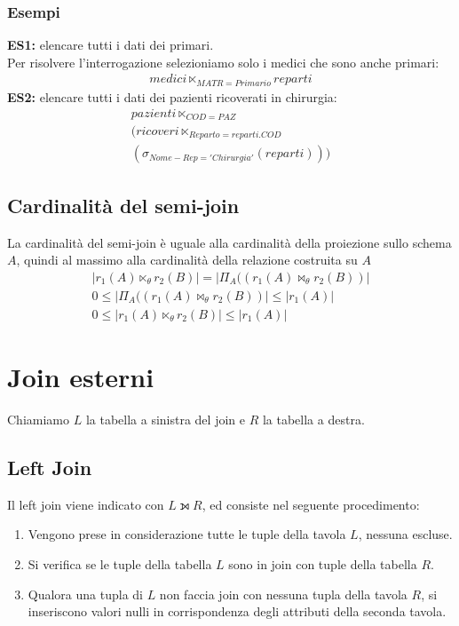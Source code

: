 \subsubsection{Esempi}
\textbf{ES1:} elencare tutti i dati dei primari.\\
Per risolvere l'interrogazione selezioniamo solo i medici che sono anche primari:
    \begin{equation}\begin{aligned}
        medici \ltimes_{MATR = Primario} reparti
    \end{aligned}\end{equation}
\textbf{ES2:} elencare tutti i dati dei pazienti ricoverati in chirurgia:
    \begin{equation}\begin{aligned}
        pazienti \ltimes_{COD = PAZ}\\
        (ricoveri \ltimes_{Reparto = reparti.COD}\\
        (\sigma_{Nome-Rep = 'Chirurgia'}(reparti)))
    \end{aligned}\end{equation}
    
\subsection{Cardinalità del semi-join}
La cardinalità del semi-join è uguale alla cardinalità della proiezione sullo schema $A$, quindi al massimo alla cardinalità della relazione costruita su $A$
    \begin{equation}\begin{aligned}
        |r_1(A) \ltimes_{\theta} r_2(B)| = 
        |\Pi_A((r_1(A) \bowtie_{\theta} r_2(B))|\\
        0 \leq |\Pi_A((r_1(A) \bowtie_{\theta} r_2(B))| \leq |r_1(A)|\\
        0 \leq |r_1(A) \ltimes_{\theta} r_2(B)| \leq |r_1(A)|
    \end{aligned}\end{equation}
    
\section{Join esterni}
Chiamiamo $L$ la tabella a sinistra del join e $R$ la tabella a destra.

\subsection{Left Join}
Il left join viene indicato con $L \leftouterjoin R$, ed consiste nel seguente procedimento:
    \begin{enumerate}
        \item{Vengono prese in considerazione tutte le tuple della tavola $L$, nessuna escluse.}
        \item{Si verifica se le tuple della tabella $L$ sono in join con tuple della tabella $R$.}
        \item{Qualora una tupla di $L$ non faccia join con nessuna tupla della tavola $R$, si inseriscono valori nulli in corrispondenza degli attributi della seconda tavola.}
    \end{enumerate}

